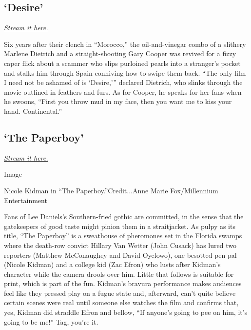 \hypertarget{desire}{%
\subsection{`Desire'}\label{desire}}

\href{https://www.peacocktv.com/watch/asset/movies/comedy/desire/cedfbfd1-21e1-30b4-9659-af7eca7ee4db}{\emph{Stream
it here.}}

Six years after their clench in ``Morocco,'' the oil-and-vinegar combo
of a slithery Marlene Dietrich and a straight-shooting Gary Cooper was
revived for a fizzy caper flick about a scammer who slips purloined
pearls into a stranger's pocket and stalks him through Spain conniving
how to swipe them back. ``The only film I need not be ashamed of is
`Desire,''' declared Dietrich, who slinks through the movie outlined in
feathers and furs. As for Cooper, he speaks for her fans when he swoons,
``First you throw mud in my face, then you want me to kiss your hand.
Continental.''

\hypertarget{the-paperboy}{%
\subsection{`The Paperboy'}\label{the-paperboy}}

\href{https://www.peacocktv.com/watch/asset/movies/drama/the-paperboy/8fc4c4a1-03d4-3399-bd89-892b6f50b3e8}{\emph{Stream
it here.}}

Image

Nicole Kidman in ``The Paperboy.''Credit...Anne Marie Fox/Millennium
Entertainment

Fans of Lee Daniels's Southern-fried gothic are committed, in the sense
that the gatekeepers of good taste might pinion them in a straitjacket.
As pulpy as its title, ``The Paperboy'' is a sweathouse of pheromones
set in the Florida swamps where the death-row convict Hillary Van Wetter
(John Cusack) has lured two reporters (Matthew McConaughey and David
Oyelowo), one besotted pen pal (Nicole Kidman) and a college kid (Zac
Efron) who lusts after Kidman's character while the camera drools over
him. Little that follows is suitable for print, which is part of the
fun. Kidman's bravura performance makes audiences feel like they pressed
play on a fugue state and, afterward, can't quite believe certain scenes
were real until someone else watches the film and confirms that, yes,
Kidman did straddle Efron and bellow, ``If anyone's going to pee on him,
it's going to be me!'' Tag, you're it.

